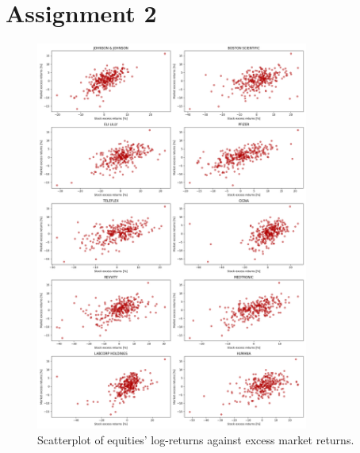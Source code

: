 \documentclass[12pt, openright, twoside]{report}
\begin{document}
\section*{Assignment 2}
\begin{figure}[h]
    \centering
    \includegraphics[width=0.8\textwidth]{images/equities_scatterplot.png}
    \caption{Scatterplot of equities' log-returns against excess market returns.}\label{fig:equities_scatterplot}
\end{figure}

\end{document}

